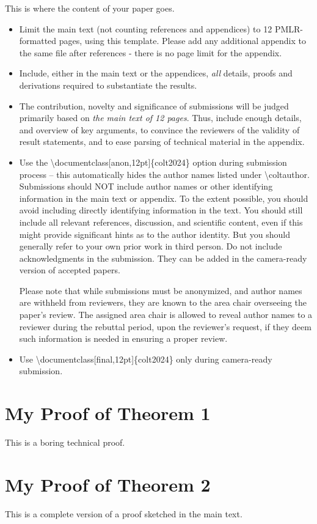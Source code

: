 \documentclass[anon,12pt]{colt2024} %
\begin{document}
This is where the content of your paper goes.
\begin{itemize}
  \item Limit the main text (not counting references and appendices) to 12 PMLR-formatted pages, using this template. Please add any additional appendix to the same file after references - there is no page limit for the appendix.
  \item Include, either in the main text or the appendices, \emph{all} details, proofs and derivations required to substantiate the results.
  \item The contribution, novelty and significance of submissions will be judged primarily based on
\textit{the main text of 12 pages}. Thus, include enough details, and overview of key arguments, 
to convince the reviewers of the validity of result statements, and to ease parsing of technical material in the appendix.
  \item Use the \textbackslash documentclass[anon,12pt]\{colt2024\} option during submission process -- this automatically hides the author names listed under \textbackslash coltauthor. Submissions should NOT include author names or other identifying information in the main text or appendix. To the extent possible, you should avoid including directly identifying information in the text. You should still include all relevant references, discussion, and scientific content, even if this might provide significant hints as to the author identity. But you should generally refer to your own prior work in third person. Do not include acknowledgments in the submission. They can be added in the camera-ready version of accepted papers. 
  
  Please note that while submissions must be anonymized, and author names are withheld from reviewers, they are known to the area chair overseeing the paper’s review.  The assigned area chair is allowed to reveal author names to a reviewer during the rebuttal period, upon the reviewer’s request, if they deem such information is needed in ensuring a proper review.  
  \item Use \textbackslash documentclass[final,12pt]\{colt2024\} only during camera-ready submission.
\end{itemize}






\appendix


\section{My Proof of Theorem 1}

This is a boring technical proof.

\section{My Proof of Theorem 2}

This is a complete version of a proof sketched in the main text.
\end{document}
